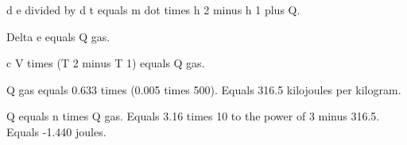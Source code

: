 d e divided by d t equals m dot times h 2 minus h 1 plus Q.  

Delta e equals Q gas.  

c V times (T 2 minus T 1) equals Q gas.  

Q gas equals 0.633 times (0.005 times 500).  
Equals 316.5 kilojoules per kilogram.  

Q equals n times Q gas.  
Equals 3.16 times 10 to the power of 3 minus 316.5.  
Equals -1.440 joules.